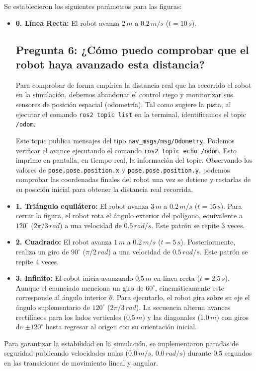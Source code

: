 Se establecieron los siguientes parámetros para las figuras:
\begin{itemize}
	\item \textbf{0. Línea Recta:} El robot avanza $2\,m$ a $0.2\,m/s$ ($t=10\,s$).
\subsection*{Pregunta 6: ¿Cómo puedo comprobar que el robot haya avanzado esta distancia?}

Para comprobar de forma empírica la distancia real que ha recorrido el robot en la simulación, debemos abandonar el control ciego y monitorizar sus sensores de posición espacial (odometría). Tal como sugiere la pista, al ejecutar el comando \texttt{ros2 topic list} en la terminal, identificamos el topic \texttt{/odom}.

Este topic publica mensajes del tipo \texttt{nav\_msgs/msg/Odometry}. Podemos verificar el avance ejecutando el comando \texttt{ros2 topic echo /odom}. Esto imprime en pantalla, en tiempo real, la información del topic. Observando los valores de \texttt{pose.pose.position.x} y \texttt{pose.pose.position.y}, podemos comprobar las coordenadas finales del robot una vez se detiene y restarlas de su posición inicial para obtener la distancia real recorrida.
	\item \textbf{1. Triángulo equilátero:} El robot avanza $3\,m$ a $0.2\,m/s$ ($t=15\,s$). Para cerrar la figura, el robot rota el ángulo exterior del polígono, equivalente a $120^\circ$ ($2\pi/3\,rad$) a una velocidad de $0.5\,rad/s$. Este patrón se repite 3 veces.
	\item \textbf{2. Cuadrado:} El robot avanza $1\,m$ a $0.2\,m/s$ ($t=5\,s$). Posteriormente, realiza un giro de $90^\circ$ ($\pi/2\,rad$) a una velocidad de $0.5\,rad/s$. Este patrón se repite 4 veces.
	\item \textbf{3. Infinito:} El robot inicia avanzando $0.5\,m$ en línea recta ($t=2.5\,s$). Aunque el enunciado menciona un giro de $60^\circ$, cinemáticamente este corresponde al ángulo interior $\theta$. Para ejecutarlo, el robot gira sobre su eje el ángulo suplementario de $120^\circ$ ($2\pi/3\,rad$). La secuencia alterna avances rectilíneos para los lados verticales ($0.5\,m$) y las diagonales ($1.0\,m$) con giros de $\pm120^\circ$ hasta regresar al origen con su orientación inicial.
\end{itemize}

Para garantizar la estabilidad en la simulación, se implementaron paradas de seguridad publicando velocidades nulas ($0.0\,m/s$, $0.0\,rad/s$) durante $0.5$ segundos en las transiciones de movimiento lineal y angular.

